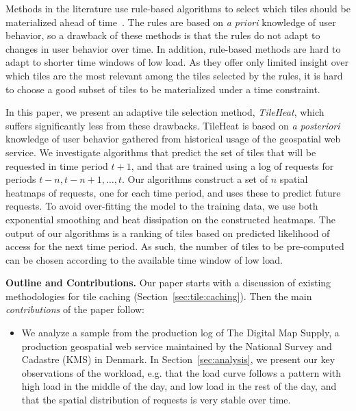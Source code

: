 \documentclass[11pt, oneside]{report}
\newcommand{\minisec}[1]{\noindent\textbf{#1.}}
\begin{document}
{%
Methods in the literature use rule-based algorithms to select which tiles should be materialized ahead of time~\cite{quinn10}. The rules are based on \emph{a priori} knowledge of user behavior, so a drawback of these methods is that the rules do not adapt to changes in user behavior over time. In addition, rule-based methods are hard to adapt to shorter time windows of low load. As they offer only limited insight over which tiles are the most relevant among the tiles selected by the rules, it is hard to choose a good subset of tiles to be materialized under a time constraint.  

In this paper, we present an adaptive tile selection method, \emph{TileHeat}, which suffers significantly less from these drawbacks. TileHeat is based on  \emph{a posteriori} knowledge of user behavior gathered from historical usage of the geospatial web service. We investigate algorithms that predict the set of tiles that will be requested in time period $t + 1$, and that are trained using a log of requests for periods $t-n, t -n + 1, \ldots, t$. Our algorithms construct a set of $n$ spatial heatmaps of requests, one for each time period, and uses these to predict future requests. To avoid over-fitting the model to the training data, we use both exponential smoothing and heat dissipation on the constructed heatmaps. The output of our algorithms is a ranking of tiles based on predicted likelihood of access for the next time period. As such, the number of tiles to be pre-computed can be chosen according to the available time window of low load.	

\minisec{Outline and Contributions}
Our paper starts with a discussion of existing methodologies for tile caching (Section~\ref{sec:tile:caching}). Then the main \emph{contributions} of the paper follow:
%
\begin{itemize}

\item We analyze a sample from the production log of The Digital Map Supply, a production geospatial web service maintained by the National Survey and Cadastre (KMS) in Denmark. In Section~\ref{sec:analysis}, we present our key observations of the workload, e.g. that the load curve follows a pattern with high load in the middle of the day, and low load in the rest of the day, and that the spatial distribution of requests is very stable over time.


\end{itemize}}
\end{document}
